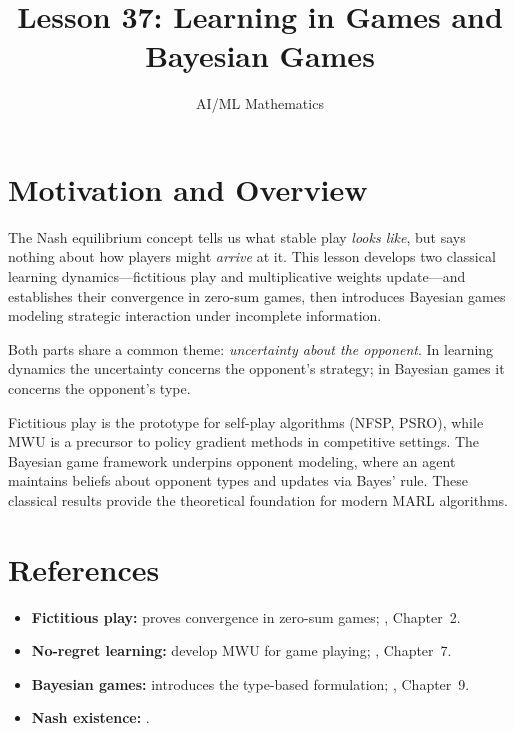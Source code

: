 \documentclass[11pt,a4paper]{article}
\title{Lesson 37: Learning in Games and Bayesian Games}
\author{AI/ML Mathematics}
\date{}
\begin{document}
\maketitle
\tableofcontents
\newpage


\section{Motivation and Overview}
\label{sec:motivation}

The Nash equilibrium concept tells us what stable play \emph{looks like},
but says nothing about how players might \emph{arrive} at it. This lesson
develops two classical learning dynamics---fictitious play and
multiplicative weights update---and establishes their convergence in
zero-sum games, then introduces Bayesian games modeling strategic
interaction under incomplete information.

Both parts share a common theme: \emph{uncertainty about the opponent}.
In learning dynamics the uncertainty concerns the opponent's strategy; in
Bayesian games it concerns the opponent's type.

\begin{rlconnection}[title={From Game Learning to Multi-Agent RL}]
Fictitious play is the prototype for self-play algorithms (NFSP, PSRO),
while MWU is a precursor to policy gradient methods in competitive
settings. The Bayesian game framework underpins opponent modeling, where
an agent maintains beliefs about opponent types and updates via Bayes'
rule. These classical results provide the theoretical foundation for
modern MARL algorithms.
\end{rlconnection}


\section{References}
\label{sec:references}

\begin{itemize}
    \item \textbf{Fictitious play:} \citet{robinson1951} proves
    convergence in zero-sum games; \citet{fudenberg1991}, Chapter~2.
    \item \textbf{No-regret learning:} \citet{freund1999} develop MWU
    for game playing; \citet{shoham2008}, Chapter~7.
    \item \textbf{Bayesian games:} \citet{harsanyi1967} introduces the
    type-based formulation; \citet{osborne1994}, Chapter~9.
    \item \textbf{Nash existence:} \citet{nash1950,nash1951}.
\end{itemize}
\end{document}
